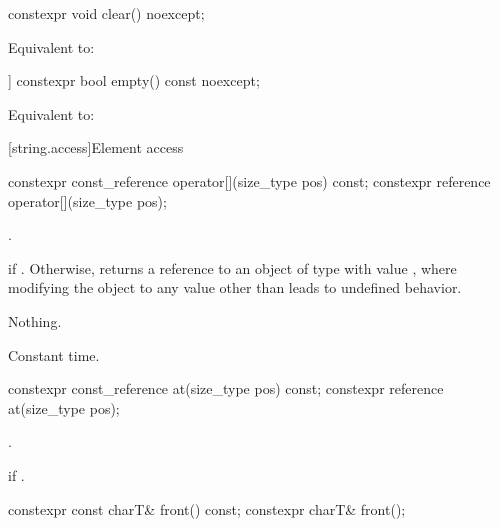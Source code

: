 %
\begin{itemdecl}
constexpr void clear() noexcept;
\end{itemdecl}

\begin{itemdescr}
\pnum
\effects
Equivalent to: 
\end{itemdescr}

%
\begin{itemdecl}
[[nodiscard]] constexpr bool empty() const noexcept;
\end{itemdecl}

\begin{itemdescr}
\pnum
\effects
Equivalent to:
\end{itemdescr}

[string.access]{Element access}

%
\begin{itemdecl}
constexpr const_reference operator[](size_type pos) const;
constexpr reference       operator[](size_type pos);
\end{itemdecl}

\begin{itemdescr}
\pnum
\expects
{}.

\pnum
\returns
{} if . Otherwise,
returns a reference to an object of type  with value
, where modifying the object to any value other than
 leads to undefined behavior.

\pnum
\throws
Nothing.

\pnum
\complexity
Constant time.
\end{itemdescr}

%
\begin{itemdecl}
constexpr const_reference at(size_type pos) const;
constexpr reference       at(size_type pos);
\end{itemdecl}

\begin{itemdescr}
\pnum
\returns
{}.

\pnum
\throws
{}
if
.
\end{itemdescr}

%
\begin{itemdecl}
constexpr const charT& front() const;
constexpr charT& front();
\end{itemdecl}

